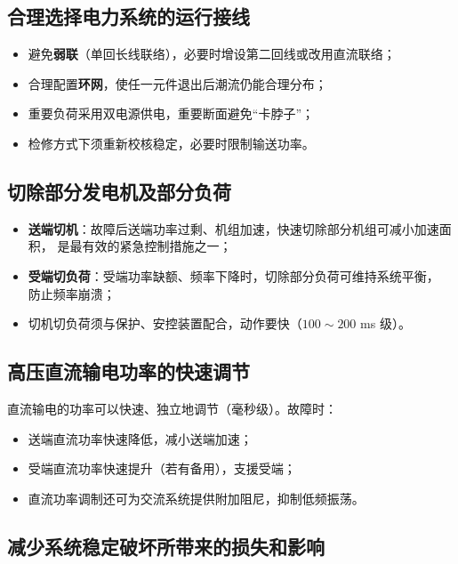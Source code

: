 \subsection{合理选择电力系统的运行接线}

\begin{itemize}
  \item 避免\textbf{弱联}（单回长线联络），必要时增设第二回线或改用直流联络；
  \item 合理配置\textbf{环网}，使任一元件退出后潮流仍能合理分布；
  \item 重要负荷采用双电源供电，重要断面避免“卡脖子”；
  \item 检修方式下须重新校核稳定，必要时限制输送功率。
\end{itemize}

\subsection{切除部分发电机及部分负荷}

\begin{itemize}
  \item \textbf{送端切机}：故障后送端功率过剩、机组加速，快速切除部分机组可减小加速面积，
        是最有效的紧急控制措施之一；
  \item \textbf{受端切负荷}：受端功率缺额、频率下降时，切除部分负荷可维持系统平衡，
        防止频率崩溃；
  \item 切机切负荷须与保护、安控装置配合，动作要快（$100\sim200$ ms 级）。
\end{itemize}

\subsection{高压直流输电功率的快速调节}

直流输电的功率可以快速、独立地调节（毫秒级）。故障时：
\begin{itemize}
  \item 送端直流功率快速降低，减小送端加速；
  \item 受端直流功率快速提升（若有备用），支援受端；
  \item 直流功率调制还可为交流系统提供附加阻尼，抑制低频振荡。
\end{itemize}

\subsection{减少系统稳定破坏所带来的损失和影响}

